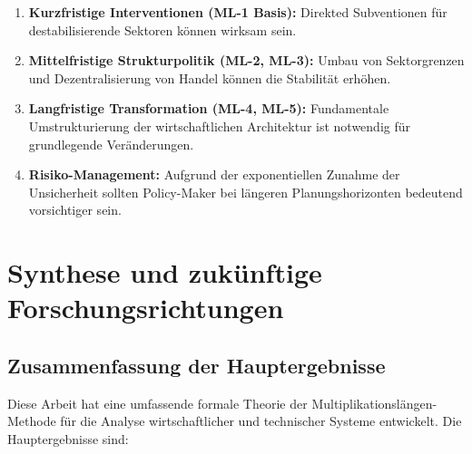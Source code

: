 \documentclass[a4paper,12pt]{article}
\theoremstyle{definition}
\begin{document}
\begin{enumerate}
\item \textbf{Kurzfristige Interventionen (ML-1 Basis):} Direkted Subventionen für destabilisierende Sektoren können wirksam sein.

\item \textbf{Mittelfristige Strukturpolitik (ML-2, ML-3):} Umbau von Sektorgrenzen und Dezentralisierung von Handel können die Stabilität erhöhen.

\item \textbf{Langfristige Transformation (ML-4, ML-5):} Fundamentale Umstrukturierung der wirtschaftlichen Architektur ist notwendig für grundlegende Veränderungen.

\item \textbf{Risiko-Management:} Aufgrund der exponentiellen Zunahme der Unsicherheit sollten Policy-Maker bei längeren Planungshorizonten bedeutend vorsichtiger sein.
\end{enumerate}

\section{Synthese und zukünftige Forschungsrichtungen}

\subsection{Zusammenfassung der Hauptergebnisse}

Diese Arbeit hat eine umfassende formale Theorie der Multiplikationslängen-Methode für die Analyse wirtschaftlicher und technischer Systeme entwickelt. Die Hauptergebnisse sind:
\end{document}
